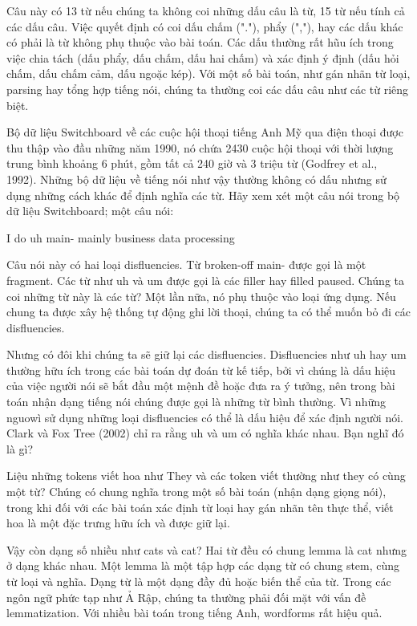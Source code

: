 Câu này có 13 từ nếu chúng ta không coi những dấu câu là từ, 15 từ nếu tính cả các dấu câu. Việc quyết định có coi dấu chấm ("."), phẩy (","), hay các dấu khác có phải là từ không phụ thuộc vào bài toán. Các dấu thường rất hũu ích trong việc chia tách (dấu phẩy, dấu chấm, dấu hai chấm) và xác định ý định (dấu hỏi chấm, dấu chấm cảm, dấu ngoặc kép). Với một số bài toán, như gán nhãn từ loại, parsing hay tổng hợp tiếng nói, chúng ta thường coi các dấu câu như các từ riêng biệt.

Bộ dữ liệu Switchboard về các cuộc hội thoại tiếng Anh Mỹ qua điện thoại được thu thập vào đầu những năm 1990, nó chứa 2430 cuộc hội thoại với thời lượng trung bình khoảng 6 phút, gồm tất cả 240 giờ và 3 triệu từ (Godfrey et al., 1992). Những bộ dữ liệu về tiếng nói như vậy thường không có dấu nhưng sử dụng những cách khác để định nghĩa các từ. Hãy xem xét một câu nói trong bộ dữ liệu Switchboard; một câu nói:

I do uh main- mainly business data processing

Câu nói này có hai loại disfluencies. Từ broken-off main- được gọi là một fragment. Các từ như uh và um được gọi là các filler hay filled paused. Chúng ta coi những từ này là các từ? Một lần nữa, nó phụ thuộc vào loại ứng dụng. Nếu chung ta được xây hệ thống tự động ghi lời thoại, chúng ta có thể muốn bỏ đi các disfluencies.

Nhưng có đôi khi chúng ta sẽ giữ lại các disfluencies. Disfluencies như uh hay um thường hữu ích trong các bài toán dự đoán từ kế tiếp, bởi vì chúng là dấu hiệu của việc người nói sẽ bắt đầu một mệnh đề hoặc đưa ra ý tưởng, nên trong bài toán nhận dạng tiếng nói chúng được gọi là những từ bình thường. Vì những nguowì sử dụng những loại disfluencies có thể là dấu hiệu để xác định người nói. Clark và Fox Tree (2002) chỉ ra rằng uh và um có nghĩa khác nhau. Bạn nghĩ đó là gì?

Liệu những tokens viết hoa như They và các token viết thường như they có cùng một từ? Chúng có chung nghĩa trong một số bài toán (nhận dạng giọng nói), trong khi đối với các bài toán xác định từ loại hay gán nhãn tên thực thể, viết hoa là một đặc trưng hữu ích và được giữ lại.

Vậy còn dạng số nhiều như cats và cat? Hai từ đều có chung lemma là cat nhưng ở dạng khác nhau. Một lemma là một tập hợp các dạng từ có chung stem, cùng từ loại và nghĩa. Dạng từ là một dạng đầy đủ hoặc biến thể của từ. Trong các ngôn ngữ phức tạp như Ả Rập, chúng ta thường phải đối mặt với vấn đề lemmatization. Với nhiều bài toán trong tiếng Anh, wordforms rất hiệu quả.